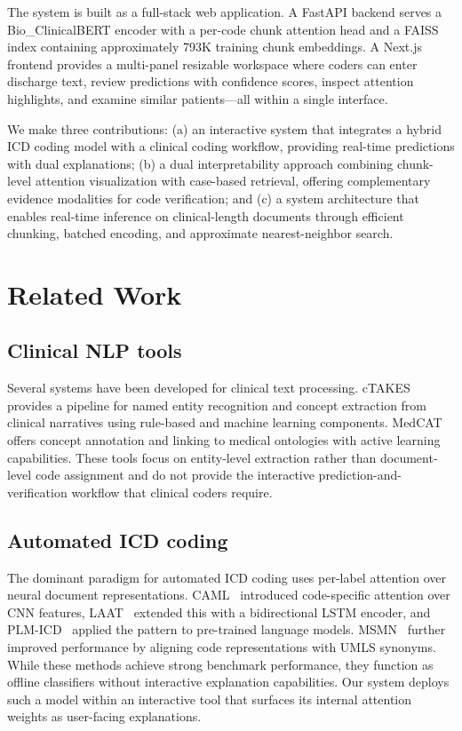 \documentclass[conference]{IEEEtran}
\begin{document}
The system is built as a full-stack web application. A FastAPI backend serves a Bio\_ClinicalBERT encoder with a per-code chunk attention head and a FAISS index containing approximately 793K training chunk embeddings. A Next.js frontend provides a multi-panel resizable workspace where coders can enter discharge text, review predictions with confidence scores, inspect attention highlights, and examine similar patients---all within a single interface.

We make three contributions: (a) an interactive system that integrates a hybrid ICD coding model with a clinical coding workflow, providing real-time predictions with dual explanations; (b) a dual interpretability approach combining chunk-level attention visualization with case-based retrieval, offering complementary evidence modalities for code verification; and (c) a system architecture that enables real-time inference on clinical-length documents through efficient chunking, batched encoding, and approximate nearest-neighbor search.

\section{Related Work}

\subsection{Clinical NLP tools}

Several systems have been developed for clinical text processing. cTAKES~\cite{b_ctakes} provides a pipeline for named entity recognition and concept extraction from clinical narratives using rule-based and machine learning components. MedCAT~\cite{b_medcat} offers concept annotation and linking to medical ontologies with active learning capabilities. These tools focus on entity-level extraction rather than document-level code assignment and do not provide the interactive prediction-and-verification workflow that clinical coders require.

\subsection{Automated ICD coding}

The dominant paradigm for automated ICD coding uses per-label attention over neural document representations. CAML~\cite{b_mullenbach2018} introduced code-specific attention over CNN features, LAAT~\cite{b_vu2020} extended this with a bidirectional LSTM encoder, and PLM-ICD~\cite{b_plmicd} applied the pattern to pre-trained language models. MSMN~\cite{b_yuan2022} further improved performance by aligning code representations with UMLS synonyms. While these methods achieve strong benchmark performance, they function as offline classifiers without interactive explanation capabilities. Our system deploys such a model within an interactive tool that surfaces its internal attention weights as user-facing explanations.
\end{document}
